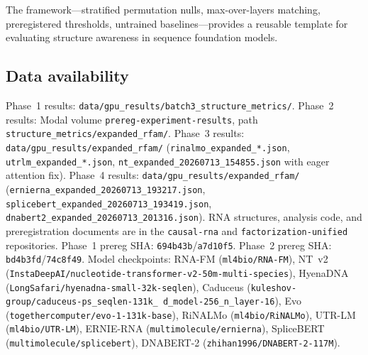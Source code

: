 \documentclass[11pt]{article}
\begin{document}
The framework---stratified permutation nulls, max-over-layers
matching, preregistered thresholds, untrained baselines---provides a
reusable template for evaluating structure awareness in sequence
foundation models.

\subsection*{Data availability}

Phase~1 results: \texttt{data/gpu\_results/batch3\_structure\_metrics/}.
Phase~2 results: Modal volume \texttt{prereg-experiment-results},
path \texttt{structure\_metrics/expanded\_rfam/}.
Phase~3 results: \texttt{data/gpu\_results/expanded\_rfam/}
(\texttt{rinalmo\_expanded\_*.json}, \texttt{utrlm\_expanded\_*.json},
\texttt{nt\_expanded\_20260713\_154855.json} with eager attention fix).
Phase~4 results: \texttt{data/gpu\_results/expanded\_rfam/}
(\texttt{ernierna\_expanded\_20260713\_193217.json},
\texttt{splicebert\_expanded\_20260713\_193419.json},
\texttt{dnabert2\_expanded\_20260713\_201316.json}).
RNA structures, analysis code, and preregistration documents are in
the \texttt{causal-rna} and \texttt{factorization-unified}
repositories.
Phase~1 prereg SHA: \texttt{694b43b}/\texttt{a7d10f5}.
Phase~2 prereg SHA: \texttt{bd4b3fd}/\texttt{74c8f49}.
Model checkpoints: RNA-FM (\texttt{ml4bio/RNA-FM}), NT~v2
(\texttt{InstaDeepAI/nucleotide-transformer-v2-50m-multi-species}),
HyenaDNA (\texttt{LongSafari/hyenadna-small-32k-seqlen}),
Caduceus (\texttt{kuleshov-group/caduceus-ps\_seqlen-131k\_%
d\_model-256\_n\_layer-16}),
Evo (\texttt{togethercomputer/evo-1-131k-base}),
RiNALMo (\texttt{ml4bio/RiNALMo}),
UTR-LM (\texttt{ml4bio/UTR-LM}),
ERNIE-RNA (\texttt{multimolecule/ernierna}),
SpliceBERT (\texttt{multimolecule/splicebert}),
DNABERT-2 (\texttt{zhihan1996/DNABERT-2-117M}).



\end{document}
